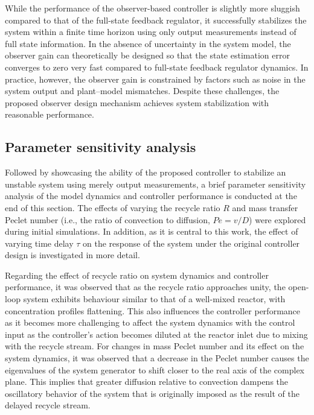 While the performance of the observer-based controller is slightly more sluggish compared to that of the full-state feedback regulator, it successfully stabilizes the system within a finite time horizon using only output measurements instead of full state information. In the absence of uncertainty in the system model, the observer gain can theoretically be designed so that the state estimation error converges to zero very fast compared to full-state feedback regulator dynamics. In practice, however, the observer gain is constrained by factors such as noise in the system output and plant--model mismatches. Despite these challenges, the proposed observer design mechanism achieves system stabilization with reasonable performance.

\subsection{Parameter sensitivity analysis}

Followed by showcasing the ability of the proposed controller to stabilize an unstable system using merely output measurements, a brief parameter sensitivity analysis of the model dynamics and controller performance is conducted at the end of this section. The effects of varying the recycle ratio $R$ and mass transfer Peclet number (i.e., the ratio of convection to diffusion, $Pe = v/D$) were explored during initial simulations. In addition, as it is central to this work, the effect of varying time delay $\tau$ on the response of the system under the original controller design is investigated in more detail.

Regarding the effect of recycle ratio on system dynamics and controller performance, it was observed that as the recycle ratio approaches unity, the open-loop system exhibits behaviour similar to that of a well-mixed reactor, with concentration profiles flattening. This also influences the controller performance as it becomes more challenging to affect the system dynamics with the control input as the controller's action becomes diluted at the reactor inlet due to mixing with the recycle stream. For changes in mass Peclet number and its effect on the system dynamics, it was observed that a decrease in the Peclet number causes the eigenvalues of the system generator to shift closer to the real axis of the complex plane. This implies that greater diffusion relative to convection dampens the oscillatory behavior of the system that is originally imposed as the result of the delayed recycle stream.

